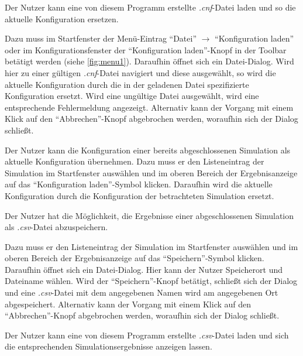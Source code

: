 \documentclass[parskip=full,11pt]{scrartcl}
\begin{document}
Der \Gls{Nutzer} kann eine von diesem Programm erstellte \textit{.cnf}-Datei laden und so die \Gls{aktuelle Konfiguration} ersetzen.

Dazu muss im Startfenster der Menü-Eintrag \enquote{Datei} \(\rightarrow\) \enquote{\Gls{Konfiguration} laden} oder im Konfigurationsfenster der \enquote{\Gls{Konfiguration} laden}-Knopf in der Toolbar betätigt werden (siehe \cref{fig:menu1}). Daraufhin öffnet sich ein Datei-Dialog. Wird hier zu einer gültigen \textit{.cnf}-Datei navigiert und diese ausgewählt, so wird die \Gls{aktuelle Konfiguration} durch die in der geladenen Datei spezifizierte \Gls{Konfiguration} ersetzt. Wird eine ungültige Datei ausgewählt, wird eine entsprechende Fehlermeldung angezeigt. Alternativ kann der Vorgang mit einem Klick auf den \enquote{Abbrechen}-Knopf abgebrochen werden, woraufhin sich der Dialog schließt.

Der \Gls{Nutzer} kann die \Gls{Konfiguration} einer bereits abgeschlossenen Simulation als aktuelle Konfiguration übernehmen. Dazu muss er den Listeneintrag der Simulation im Startfenster auswählen und im oberen Bereich der Ergebnisanzeige auf das \enquote{\Gls{Konfiguration} laden}-Symbol klicken. Daraufhin wird die \Gls{aktuelle Konfiguration} durch die \Gls{Konfiguration} der betrachteten Simulation ersetzt.

Der \Gls{Nutzer} hat die Möglichkeit, die Ergebnisse einer abgeschlossenen Simulation als \textit{.csv}-Datei abzuspeichern.

Dazu muss er den Listeneintrag der Simulation im Startfenster auswählen und im oberen Bereich der Ergebnisanzeige auf das \enquote{Speichern}-Symbol klicken. Daraufhin öffnet sich ein Datei-Dialog. Hier kann der \Gls{Nutzer} Speicherort und Dateiname wählen. Wird der \enquote{Speichern}-Knopf betätigt, schließt sich der Dialog und eine \textit{.csv}-Datei mit dem angegebenen Namen wird am angegebenen Ort abgespeichert. Alternativ kann der Vorgang mit einem Klick auf den \enquote{Abbrechen}-Knopf abgebrochen werden, woraufhin sich der Dialog schließt.

Der \Gls{Nutzer} kann eine von diesem Programm erstellte \textit{.csv}-Datei laden und sich die entsprechenden Simulationsergebnisse anzeigen lassen.
\end{document}
